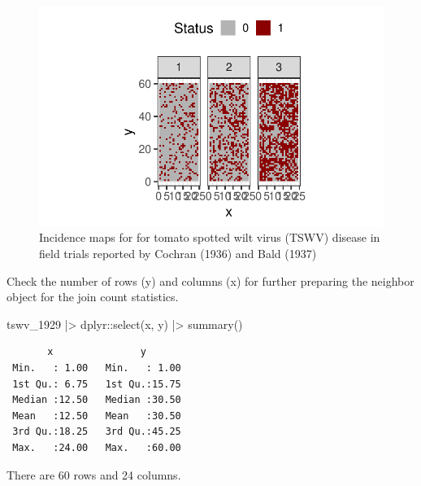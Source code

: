 \documentclass[
  letterpaper,
  DIV=11,
  numbers=noendperiod]{scrreprt}
\newenvironment{Shaded}{\begin{snugshade}}{\end{snugshade}}
\newcommand{\FunctionTok}[1]{\textcolor[rgb]{0.28,0.35,0.67}{#1}}
\newcommand{\NormalTok}[1]{\textcolor[rgb]{0.00,0.23,0.31}{#1}}
\newcommand{\SpecialCharTok}[1]{\textcolor[rgb]{0.37,0.37,0.37}{#1}}
\begin{document}
\begin{figure}[H]

{\centering \includegraphics{spatial-tests_files/figure-pdf/fig-tsw-1.pdf}

}

\caption{\label{fig-tsw}Incidence maps for for tomato spotted wilt virus
(TSWV) disease in field trials reported by Cochran (1936) and Bald
(1937)}

\end{figure}

Check the number of rows (y) and columns (x) for further preparing the
neighbor object for the join count statistics.

\begin{Shaded}
\begin{Highlighting}[]
\NormalTok{tswv\_1929 }\SpecialCharTok{|\textgreater{}} 
\NormalTok{  dplyr}\SpecialCharTok{::}\FunctionTok{select}\NormalTok{(x, y) }\SpecialCharTok{|\textgreater{}} 
  \FunctionTok{summary}\NormalTok{()}
\end{Highlighting}
\end{Shaded}

\begin{verbatim}
       x               y        
 Min.   : 1.00   Min.   : 1.00  
 1st Qu.: 6.75   1st Qu.:15.75  
 Median :12.50   Median :30.50  
 Mean   :12.50   Mean   :30.50  
 3rd Qu.:18.25   3rd Qu.:45.25  
 Max.   :24.00   Max.   :60.00  
\end{verbatim}

There are 60 rows and 24 columns.
\end{document}
